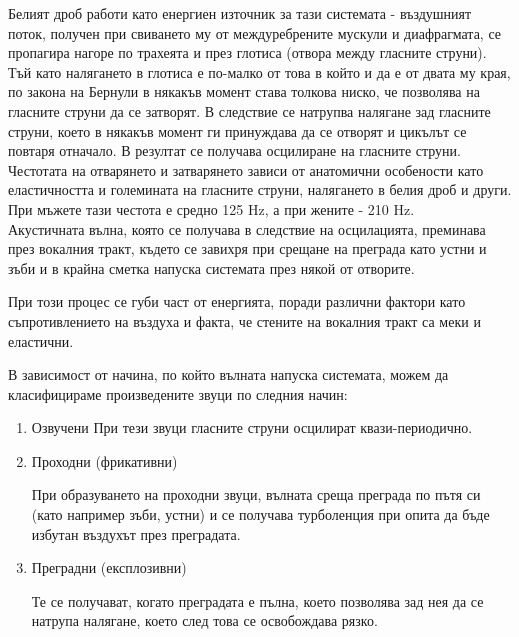 \documentclass[main.tex]{subfiles}
\begin{document}
    Белият дроб работи като енергиен източник за тази системата - въздушният поток, получен при свиването му от междуребрените мускули и диафрагмата,
    се пропагира нагоре по трахеята и през глотиса (отвора между гласните струни).\\
    Тъй като налягането в глотиса е по-малко от това в който и да е от двата му края, по закона на Бернули
    в някакъв момент става толкова ниско, че позволява на гласните струни да се затворят. В следствие се натрупва налягане зад гласните струни, което в някакъв момент ги принуждава
    да се отворят и цикълът се повтаря отначало. В резултат се получава осцилиране на гласните струни. Честотата на отварянето и затварянето зависи от анатомични особености като еластичността и големината на
    гласните струни, налягането в белия дроб и други.\\
    При мъжете тази честота е средно 125 Hz, а при жените - 210 Hz.\\
    Акустичната вълна, която се получава в следствие на осцилацията,
    преминава през вокалния тракт, където се завихря при срещане на преграда като устни и зъби и в крайна сметка напуска системата през някой от отворите.

    При този процес се губи част от енергията, поради различни фактори като съпротивлението на въздуха и факта, че стените на вокалния тракт са меки и еластични.

    В зависимост от начина, по който вълната напуска системата, можем да класифицираме произведените звуци по следния начин:

    \begin{enumerate}
        \item Озвучени
        При тези звуци гласните струни осцилират квази-периодично.
        
        \item Проходни (фрикативни) 
        
        При образуването на проходни звуци, вълната среща преграда по пътя си
        (като например зъби, устни) и се получава турболенция при опита да бъде избутан въздухът през преградата.
        
        \item Преградни (експлозивни)
        
        Те се получават, когато преградата е пълна, което позволява зад нея да се натрупа налягане, което след това се освобождава рязко.
    \end{enumerate}
    
\end{document}
